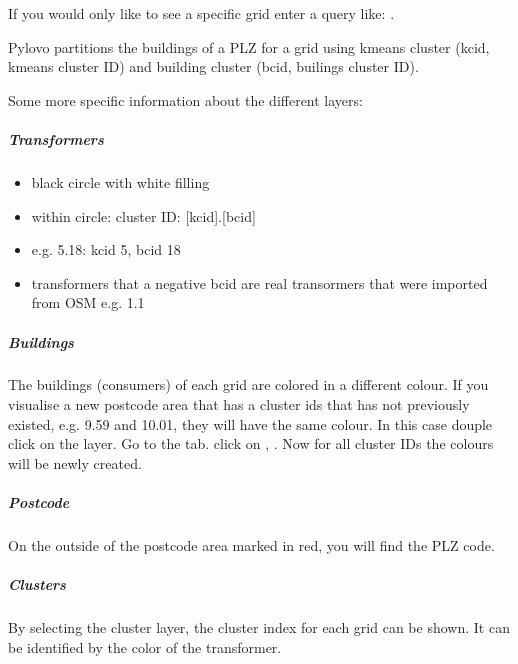 \documentclass[letterpaper,10pt,english]{sphinxmanual}
\let\sphinxpxdimen\pdfpxdimen\else\newdimen\sphinxpxdimen
\begin{document}
\noindent\sphinxincludegraphics[width=600\sphinxpxdimen]{{qgis6}.png}

\sphinxAtStartPar
If you would only like to see a specific grid enter a query like:
.

\sphinxAtStartPar
Pylovo partitions the buildings of a PLZ for a grid using k\sphinxhyphen{}means cluster (kcid, k\sphinxhyphen{}means cluster ID) and
building cluster (bcid, builings cluster ID).

\sphinxAtStartPar
Some more specific information about the different layers:


\subparagraph{Transformers}
\label{\detokenize{visualisation/qgis/qgis:transformers}}\begin{itemize}
\item {} 
\sphinxAtStartPar
black circle with white filling

\item {} 
\sphinxAtStartPar
within circle: cluster \sphinxhyphen{} ID: {[}kcid{]}.{[}bcid{]}

\item {} 
\sphinxAtStartPar
e.g. 5.18: kcid 5, bcid 18

\item {} 
\sphinxAtStartPar
transformers that a negative bcid are real transormers that were imported from OSM e.g. 1.\sphinxhyphen{}1

\end{itemize}


\subparagraph{Buildings}
\label{\detokenize{visualisation/qgis/qgis:buildings}}
\sphinxAtStartPar
The buildings (consumers) of each grid are colored in a different colour.
If you visualise a new postcode area that has a cluster ids that has not previously existed, e.g. 9.59 and 10.01,
they will have the same colour.
In this case douple click on the layer. Go to the  tab. click on , .
Now for all cluster IDs the colours will be newly created.


\subparagraph{Postcode}
\label{\detokenize{visualisation/qgis/qgis:postcode}}
\sphinxAtStartPar
On the outside of the postcode area marked in red, you will find the PLZ code.


\subparagraph{Clusters}
\label{\detokenize{visualisation/qgis/qgis:clusters}}
\sphinxAtStartPar
By selecting the cluster layer, the cluster index for each grid can be shown. It can be identified by the color of the
transformer.
\end{document}
